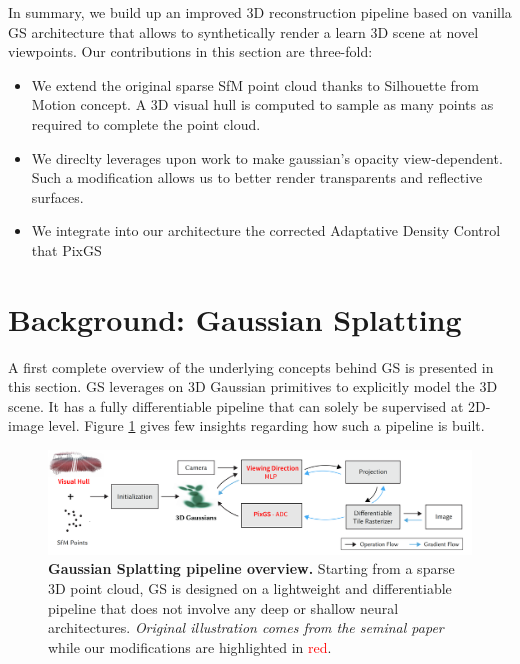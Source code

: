 In summary, we build up an improved 3D reconstruction pipeline based on vanilla \ac{GS} architecture that allows to synthetically render a learn 3D scene at novel viewpoints. Our contributions in this section are three-fold: 
\begin{itemize}
  \item We extend the original sparse SfM point cloud thanks to Silhouette from Motion concept. A 3D visual hull is computed to sample as many points as required to complete the point cloud. 
  \item We direclty leverages upon \citep{malarz2023gaussian} work to make gaussian's opacity view-dependent. Such a modification allows us to better render transparents and reflective surfaces. 
  \item We integrate into our architecture the corrected Adaptative Density Control that PixGS \citep{zhang2024pixelgs} 
    
\end{itemize}

\section{Background: Gaussian Splatting}
A first complete overview of the underlying concepts behind GS is presented in this section. GS leverages on 3D Gaussian primitives to explicitly model the 3D scene. It has a fully differentiable pipeline that can solely be supervised at 2D-image level. Figure \ref{fig:gs-overview} gives few insights regarding how such a pipeline is built. \newline

\begin{figure}[htb!]
    \center
  \includegraphics[width=\linewidth]{images/gaussiansplatting/overview_pipeline.png}
  \caption{\textbf{Gaussian Splatting pipeline overview.} Starting from a sparse 3D point cloud, GS is designed on a lightweight and differentiable pipeline that does not involve any deep or shallow neural architectures. \textit{Original illustration comes from the seminal paper}\cite{kerbl20233d} while our modifications are highlighted in \textcolor{red}{red}.}
  \label{fig:gs-overview}
\end{figure}

